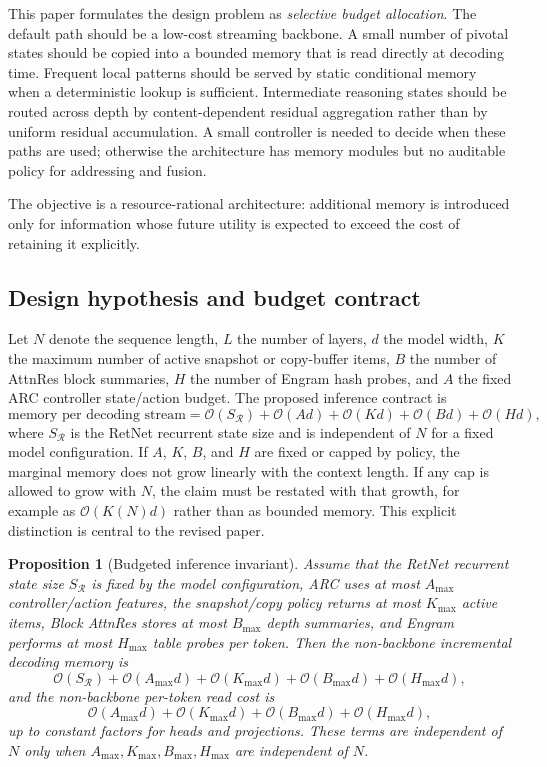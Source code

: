 \documentclass[11pt]{article}
\newtheorem{proposition}[theorem]{Proposition}
\newcommand{\Ret}{\mathcal{R}}
\newcommand{\Oh}{\mathcal{O}}
\begin{document}
This paper formulates the design problem as \emph{selective budget allocation}. The default path should be a low-cost streaming backbone. A small number of pivotal states should be copied into a bounded memory that is read directly at decoding time. Frequent local patterns should be served by static conditional memory when a deterministic lookup is sufficient. Intermediate reasoning states should be routed across depth by content-dependent residual aggregation rather than by uniform residual accumulation. A small controller is needed to decide when these paths are used; otherwise the architecture has memory modules but no auditable policy for addressing and fusion.

The objective is a resource-rational architecture: additional memory is introduced only for information whose future utility is expected to exceed the cost of retaining it explicitly.

\subsection{Design hypothesis and budget contract}

Let $N$ denote the sequence length, $L$ the number of layers, $d$ the model width, $K$ the maximum number of active snapshot or copy-buffer items, $B$ the number of AttnRes block summaries, $H$ the number of Engram hash probes, and $A$ the fixed ARC controller state/action budget. The proposed inference contract is
\begin{equation}
\label{eq:budget-contract}
\text{memory per decoding stream}
= \Oh(S_{\Ret}) + \Oh(Ad) + \Oh(Kd) + \Oh(Bd) + \Oh(Hd),
\end{equation}
where $S_{\Ret}$ is the RetNet recurrent state size and is independent of $N$ for a fixed model configuration. If $A$, $K$, $B$, and $H$ are fixed or capped by policy, the marginal memory does not grow linearly with the context length. If any cap is allowed to grow with $N$, the claim must be restated with that growth, for example as $\Oh(K(N)d)$ rather than as bounded memory. This explicit distinction is central to the revised paper.


\begin{proposition}[Budgeted inference invariant]
\label{prop:budget-invariant}
Assume that the RetNet recurrent state size $S_{\Ret}$ is fixed by the model configuration, ARC uses at most $A_{\max}$ controller/action features, the snapshot/copy policy returns at most $K_{\max}$ active items, Block AttnRes stores at most $B_{\max}$ depth summaries, and Engram performs at most $H_{\max}$ table probes per token. Then the non-backbone incremental decoding memory is
\begin{equation}
\Oh(S_{\Ret})+\Oh(A_{\max}d)+\Oh(K_{\max}d)+\Oh(B_{\max}d)+\Oh(H_{\max}d),
\end{equation}
and the non-backbone per-token read cost is
\begin{equation}
\Oh(A_{\max}d)+\Oh(K_{\max}d)+\Oh(B_{\max}d)+\Oh(H_{\max}d),
\end{equation}
up to constant factors for heads and projections. These terms are independent of $N$ only when $A_{\max},K_{\max},B_{\max},H_{\max}$ are independent of $N$.
\end{proposition}
\end{document}
